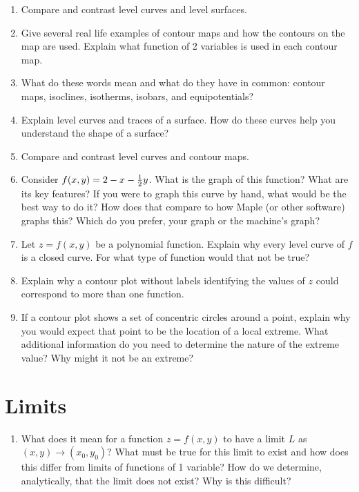 \begin{enumerate}
\item  Compare and contrast level curves and level surfaces.

\item  Give several real life examples of contour maps and how the contours on the map are used.  Explain what function of 2 variables is used in each contour map.

\item  What do these words mean and what do they have in common:  contour maps, isoclines, isotherms, isobars, and equipotentials?

\item  Explain level curves and traces of a surface.  How do these curves help you understand the shape of a surface?

\item  Compare and contrast level curves and contour maps.

\item  Consider $f(x,y) = 2 - x - {\textstyle{1 \over 2}}y$.  What is the graph of this function?  What are its key features?  If you were to graph this curve by hand, what would be the best way to do it?  How does that compare to how Maple (or other software) graphs this?  Which do you prefer, your graph or the machine's graph?

\item  Let $z = f(x, y)$ be a polynomial function.  Explain why every level curve of $f$ is a closed curve.  For what type of function would that not be true?

\item  Explain why a contour plot without labels identifying the values of $z$ could correspond to more than one function.  \cite{SM}

\item  If a contour plot shows a set of concentric circles around a point, explain why you would expect that point to be the location of a local extreme.  \cite{SM}  What additional information do you need to determine the nature of the extreme value? Why might it not be an extreme?

 \end{enumerate}\section{Limits}\begin{enumerate}

\item  What does it mean for a function $z = f(x, y)$ to have a limit $L$ as $(x,  y) \rightarrow (x_0, y_0)$? \cite{FWG}   What must be true for this limit to exist and how does this differ from limits of functions of 1 variable?  How do we determine, analytically, that the limit does not exist?  Why is this difficult?  


\end{enumerate}
